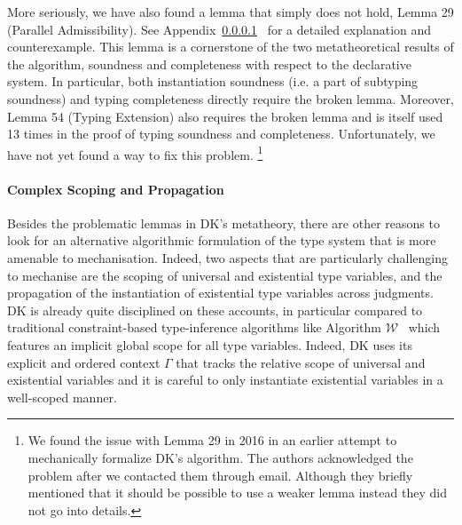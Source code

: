 
More seriously, we have also found a lemma that simply does not hold, 
Lemma 29 (Parallel Admissibility). See Appendix~\ref{}~ for a detailed explanation
and counterexample. This lemma is a cornerstone of the two metatheoretical results 
of the algorithm, soundness and completeness with respect to the declarative system.
In particular, both instantiation soundness (i.e. a part of subtyping
soundness) and typing completeness directly require the broken lemma.
Moreover, Lemma 54 (Typing Extension) also requires the broken lemma and is
itself used 13 times in the proof of typing soundness and completeness.
Unfortunately, we have not yet found a way to fix this problem.
\footnote{We found the issue with Lemma 29 in 2016 in an earlier attempt to mechanically
  formalize DK's algorithm. The authors acknowledged the problem after we contacted them through email.
  Although they briefly mentioned that it should be possible to use a weaker lemma instead they did
  not go into details.
}

\paragraph{Complex Scoping and Propagation}

Besides the problematic lemmas in DK's metatheory, there are other reasons to
look for an alternative algorithmic formulation of the type system that is more
amenable to mechanisation. Indeed, two aspects that are particularly
challenging to mechanise are the scoping of universal and existential type
variables, and the propagation of the instantiation of existential type
variables across judgments. 
DK is already quite disciplined on these accounts, in particular compared to
traditional constraint-based type-inference algorithms like Algorithm $\mathcal{W}$~\cite{milner1978theory} which
features an implicit global scope for all type variables. Indeed, DK uses its
explicit and ordered context $\Gamma$ that tracks the relative scope of universal and
existential variables and it is careful to only instantiate existential
variables in a well-scoped manner.

